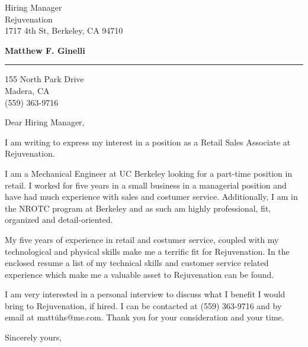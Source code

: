 \documentclass{letter} %
\begin{document}
\signature{Matthew F. Ginelli}           %
\longindentation=0pt                       %
\let\raggedleft\raggedright                %
 
 
\begin{letter}{
Hiring Manager \\
Rejuvenation \\
1717 4th St, Berkeley, CA 94710}

\begin{center}
{\large\bf Matthew F. Ginelli} 
\end{center}
\medskip\hrule height 1pt
\begin{center}
{155 North Park Drive \\   Madera, CA  \\ (559) 363-9716} 
\end{center} \vfill %
 
 
\opening{Dear Hiring Manager,} 
 
\noindent I am writing to express my interest in a position as a Retail Sales Associate at Rejuvenation.


\noindent  I am a Mechanical Engineer at UC Berkeley looking for a part-time position in retail.  I worked for five years in a small business in a managerial position and have had much experience with sales and costumer service.  Additionally, I am in the NROTC program at Berkeley and as such am highly professional, fit, organized and detail-oriented.

\noindent  My five years of experience in retail and costumer service, coupled with my technological and physical skills make me a terrific fit for Rejuvenation.  In the enclosed resume a list of my technical skills and customer service related experience which make me a valuable asset to Rejuvenation can be found.  

 
\noindent I am very interested in a personal interview to discuss what I benefit I would bring to Rejuvenation, if hired.  I can be contacted at (559) 363-9716 and by email at matt\.uhs$@$me.com.  Thank you for your consideration and your time.  
 
\closing{Sincerely yours,} 
 

 

\end{letter}
 
\end{document}
